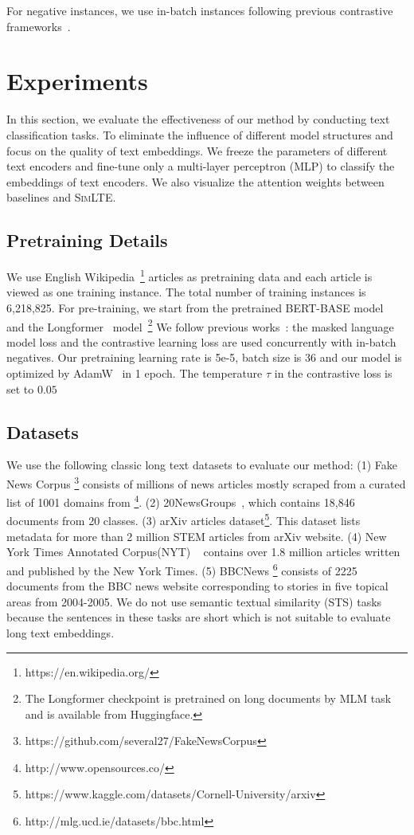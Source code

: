 \documentclass[11pt]{article}
\begin{document}
For negative instances, we use in-batch instances following previous contrastive frameworks~\cite{Gao2021SimCSESC, Li2022UCTopicUC}.

\section{Experiments}
In this section, we evaluate the effectiveness of our method by conducting text classification tasks. 
To eliminate the influence of different model structures and focus on the quality of text embeddings. 
We freeze the parameters of different text encoders and fine-tune only a multi-layer perceptron (MLP) to classify the embeddings of text encoders.
We also visualize the attention weights between baselines and \textsc{SimLTE}.

\subsection{Pretraining Details}
We use English Wikipedia~\footnote{https://en.wikipedia.org/} articles as pretraining data and each article is viewed as one training instance. 
The total number of training instances is 6,218,825. For pre-training, we start from the pretrained BERT-BASE model~\cite{Devlin2019BERTPO} and the Longformer~\cite{Beltagy2020LongformerTL} model~\footnote{The Longformer checkpoint is pretrained on long documents by MLM task and is available from Huggingface.} 
We follow previous works~\cite{Gao2021SimCSESC, Li2022UCTopicUC}: the masked language model loss and the contrastive learning loss are used concurrently with in-batch negatives. 
Our pretraining learning rate is 5e-5, batch size is 36 and our model is optimized by AdamW~\cite{Kingma2014AdamAM} in 1 epoch. 
The temperature $\tau$ in the contrastive loss is set to $0.05$

\subsection{Datasets}

We use the following classic long text datasets to evaluate our method:
(1) Fake News Corpus \footnote{https://github.com/several27/FakeNewsCorpus} consists of millions of news articles mostly scraped from a curated list of 1001 domains from \footnote{http://www.opensources.co/}.
(2) 20NewsGroups~\cite{Lang1995NewsWeederLT}, which contains 18,846 documents from 20 classes.
(3) arXiv articles dataset\footnote{https://www.kaggle.com/datasets/Cornell-University/arxiv}. This dataset lists metadata for more than 2 million STEM articles from arXiv website.
(4) New York Times Annotated Corpus(NYT) ~\cite{sandhaus2008new} contains over 1.8 million articles written and published by the New York Times.
(5) BBCNews \footnote{http://mlg.ucd.ie/datasets/bbc.html} consists of 2225 documents from the BBC news website corresponding to stories in five topical areas from 2004-2005.
We do not use semantic textual similarity (STS) tasks~\cite{Agirre2012SemEval2012T6} because the sentences in these tasks are short which is not suitable to evaluate long text embeddings.
\end{document}
